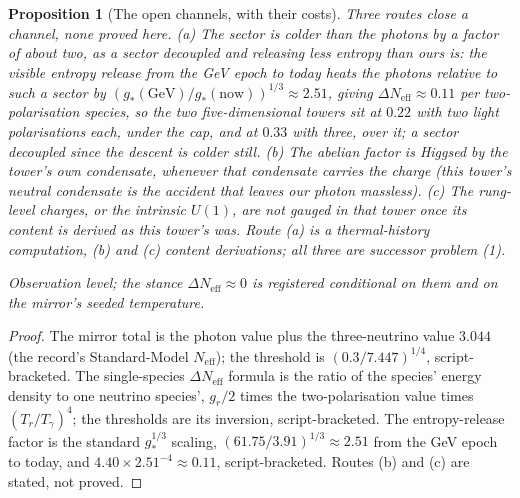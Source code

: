 \documentclass[11pt]{article}
\newtheorem{proposition}[theorem]{Proposition}
\theoremstyle{definition}
\newcommand{\Neff}{N_{\mathrm{eff}}}
\begin{document}
\begin{proposition}[The open channels, with their costs]
Three routes close a channel, none proved here. (a) The sector is colder than the photons by a factor of about two, as a sector decoupled and releasing less entropy than ours is: the visible entropy release from the GeV epoch to today heats the photons relative to such a sector by $(g_{*}(\mathrm{GeV})/g_{*}(\mathrm{now}))^{1/3} \approx 2.51$, giving $\Delta\Neff \approx 0.11$ per two-polarisation species, so the two five-dimensional towers sit at $0.22$ with two light polarisations each, under the cap, and at $0.33$ with three, over it; a sector decoupled since the descent is colder still. (b) The abelian factor is Higgsed by the tower's own condensate, whenever that condensate carries the charge (this tower's neutral condensate is the accident that leaves our photon massless). (c) The rung-level charges, or the intrinsic $U(1)$, are not gauged in that tower once its content is derived as this tower's was. Route (a) is a thermal-history computation, (b) and (c) content derivations; all three are successor problem (1).

Observation level; the stance $\Delta\Neff \approx 0$ is registered conditional on them and on the mirror's seeded temperature.
\end{proposition}

\begin{proof}
The mirror total is the photon value plus the three-neutrino value $3.044$ (the record's Standard-Model $\Neff$); the threshold is $(0.3/7.447)^{1/4}$, script-bracketed. The single-species $\Delta\Neff$ formula is the ratio of the species' energy density to one neutrino species', $g_{r}/2$ times the two-polarisation value times $(T_{r}/T_{\gamma})^{4}$; the thresholds are its inversion, script-bracketed. The entropy-release factor is the standard $g_{*}^{1/3}$ scaling, $(61.75/3.91)^{1/3} \approx 2.51$ from the GeV epoch to today, and $4.40 \times 2.51^{-4} \approx 0.11$, script-bracketed. Routes (b) and (c) are stated, not proved.
\end{proof}
\end{document}
